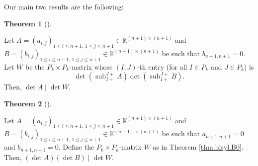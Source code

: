 \documentclass[numbers=enddot,12pt,final,onecolumn,notitlepage]{scrartcl}%
\theoremstyle{definition}
\newtheorem{theo}{Theorem}[section]
\newenvironment{theorem}[1][]
{\begin{theo}[#1]\begin{leftbar}}
{\end{leftbar}\end{theo}}
\begin{document}
Our main two results are the following:

\begin{theorem}
\label{thm.bisyl.B0}Let $A=\left(  a_{i,j}\right)  _{1\leq i\leq n+1,\ 1\leq
j\leq n+1}\in\mathbb{K}^{\left(  n+1\right)  \times\left(  n+1\right)  }$ and
$B=\left(  b_{i,j}\right)  _{1\leq i\leq n+1,\ 1\leq j\leq n+1}\in
\mathbb{K}^{\left(  n+1\right)  \times\left(  n+1\right)  }$ be such that
$b_{n+1,n+1}=0$. Let $W$ be the $P_{k}\times P_{k}$-matrix whose $\left(
I,J\right)  $-th entry (for all $I\in P_{k}$ and $J\in P_{k}$) is%
\[
\det\left(  \operatorname*{sub}\nolimits_{I+}^{J+}A\right)  \det\left(
\operatorname*{sub}\nolimits_{I+}^{J+}B\right)  .
\]
Then, $\det A\mid\det W$.
\end{theorem}

\begin{theorem}
\label{thm.bisyl.AB0}Let $A=\left(  a_{i,j}\right)  _{1\leq i\leq n+1,\ 1\leq
j\leq n+1}\in\mathbb{K}^{\left(  n+1\right)  \times\left(  n+1\right)  }$ and
$B=\left(  b_{i,j}\right)  _{1\leq i\leq n+1,\ 1\leq j\leq n+1}\in
\mathbb{K}^{\left(  n+1\right)  \times\left(  n+1\right)  }$ be such that
$a_{n+1,n+1}=0$ and $b_{n+1,n+1}=0$. Define the $P_{k}\times P_{k}$-matrix $W$
as in Theorem \ref{thm.bisyl.B0}. Then, $\left(  \det A\right)  \left(  \det
B\right)  \mid\det W$.
\end{theorem}
\end{document}
